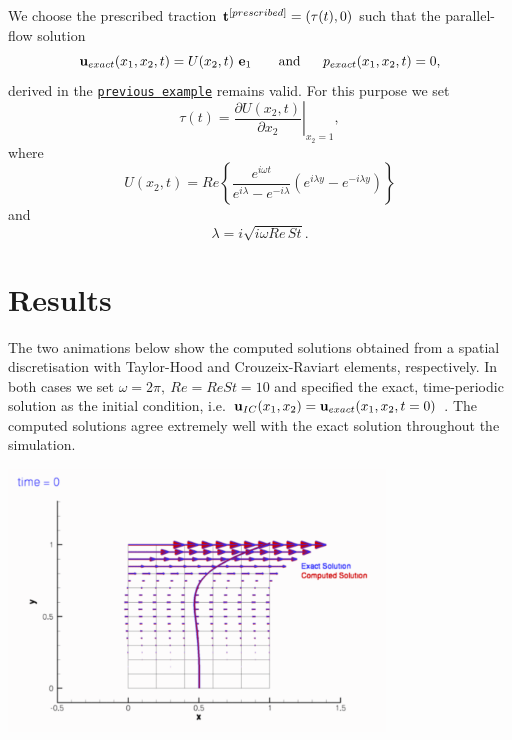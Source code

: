 We choose the prescribed traction $ {\bf t}^{[prescribed]} = (\tau(t), 0) $ such that the parallel-\/flow solution \[ {\bf u}_{exact}(x_1,x_2,t) = U(x_2,t) \ {\bf e}_1 \mbox{ \ \ \ \ \ and \ \ \ \ } p_{exact}(x_1,x_2,t) = 0, \] derived in the \href{../../rayleigh_channel/html/index.html}{\tt previous example} remains valid. For this purpose we set \[ \tau(t) = \left. \frac{\partial U(x_2,t)}{\partial x_2}\right|_{x_2=1}, \] where \[ U(x_2,t) = Re\left\{\frac{e^{i\omega t}}{e^{i\lambda}-e^{-i\lambda}}\left(e^{i\lambda y}-e^{-i\lambda y} \right)\right\} \] and \[ \lambda = i\sqrt{i\omega Re\, St}. \] 

\hypertarget{index_results}{}\section{Results}\label{index_results}
The two animations below show the computed solutions obtained from a spatial discretisation with Taylor-\/\+Hood and Crouzeix-\/\+Raviart elements, respectively. In both cases we set $ \omega=2\pi, \ Re = ReSt = 10 $ and specified the exact, time-\/periodic solution as the initial condition, i.\+e. $ {\bf u}_{IC}(x_1,x_2) = {\bf u}_{exact}(x_1,x_2,t=0)$ . The computed solutions agree extremely well with the exact solution throughout the simulation.

 
\begin{DoxyImage}
\includegraphics[width=0.75\textwidth]{velocity_vectors_CR}
\end{DoxyImage}


